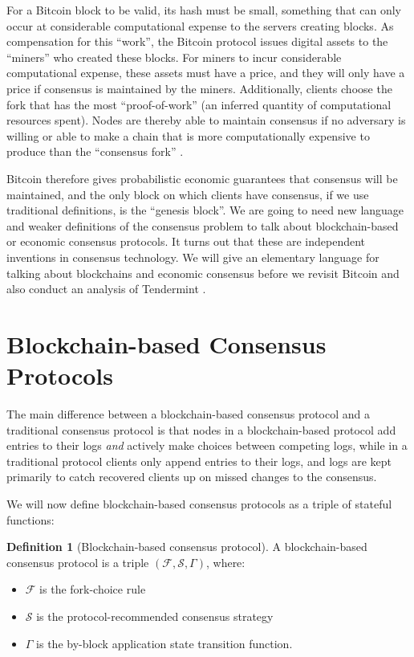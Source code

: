 \documentclass[11pt,a4paper]{article}
\theoremstyle{plain}
\theoremstyle{definition}
\newtheorem{defn}{Definition}
\begin{document}
For a Bitcoin block to be valid, its hash must be small, something that can only occur at considerable computational expense to the servers creating blocks. As compensation for this ``work'', the Bitcoin protocol issues digital assets to the ``miners'' who created these blocks. For miners to incur considerable computational expense, these assets must have a price, and they will only have a price if consensus is maintained by the miners. Additionally, clients choose the fork that has the most ``proof-of-work'' (an inferred quantity of computational resources spent). Nodes are thereby able to maintain consensus if no adversary is willing or able to make a chain that is more computationally expensive to produce than the ``consensus fork'' \cite{Bitcoin}.

Bitcoin therefore gives probabilistic economic guarantees that consensus will be maintained, and the only block on which clients have consensus, if we use traditional definitions, is the ``genesis block''. We are going to need new language and weaker definitions of the consensus problem to talk about blockchain-based or economic consensus protocols. It turns out that these are independent inventions in consensus technology. We will give an elementary language for talking about blockchains and economic consensus before we revisit Bitcoin and also conduct an analysis of Tendermint \cite{Tendermint}.

\section{Blockchain-based Consensus Protocols}

The main difference between a blockchain-based consensus protocol and a traditional consensus protocol is that nodes in a blockchain-based protocol add entries to their logs \emph{and} actively make choices between competing logs, while in a traditional protocol clients only append entries to their logs, and logs are kept primarily to catch recovered clients up on missed changes to the consensus. 

We will now define blockchain-based consensus protocols as a triple of stateful functions:

\begin{defn}[Blockchain-based consensus protocol]
A blockchain-based consensus protocol is a triple $(\mathcal{F}, \mathcal{S}, \Gamma)$, where:
\begin{itemize}
\item $\mathcal{F}$ is the fork-choice rule
\item $\mathcal{S}$ is the protocol-recommended consensus strategy
\item $\Gamma$ is the by-block application state transition function.
\end{itemize}
\end{defn}
\end{document}
